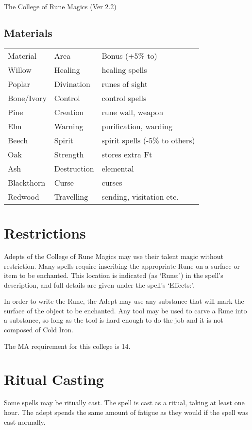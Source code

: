 \begin{Chapter}{The College of Rune Magics (Ver 2.2)}
\subsection{Materials}

\begin{tabularx}{\columnwidth}{llX}
Material	& Area		& Bonus (+5\% to) \\
Willow		& Healing	& healing spells  \\
Poplar		& Divination	& runes of sight \\
Bone/Ivory	& Control	& control spells \\
Pine		& Creation	& rune wall, weapon \\
Elm		& Warning	& purification, warding \\
Beech		& Spirit	& spirit spells (-5\% to others) \\
Oak		& Strength	& stores extra Ft \\
Ash		& Destruction	& elemental \\
Blackthorn	& Curse		& curses \\
Redwood		& Travelling	& sending, visitation etc. \\
\end{tabularx}

\section{Restrictions}

Adepts of the College of Rune Magics may use their talent magic
without restriction.  Many spells require inscribing the appropriate
Rune on a surface or item to be enchanted. This location is indicated
(as ‘Rune:’) in the spell’s description, and full details are given
under the spell’s ‘Effects:’.

In order to write the Rune, the Adept may use any substance that will
mark the surface of the object to be enchanted.  Any tool may be used
to carve a Rune into a substance, so long as the tool is hard enough
to do the job and it is not composed of Cold Iron.

The MA requirement for this college is 14. 


\section{Ritual Casting}

Some spells may be ritually cast.  The spell is cast as a ritual,
taking at least one hour.  The adept spends the same amount of fatigue
as they would if the spell was cast normally.



\end{Chapter}
